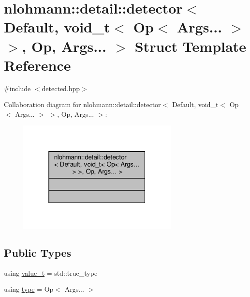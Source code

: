 \hypertarget{structnlohmann_1_1detail_1_1detector_3_01_default_00_01void__t_3_01_op_3_01_args_8_8_8_01_4_01_4_00_01_op_00_01_args_8_8_8_01_4}{}\section{nlohmann\+:\+:detail\+:\+:detector$<$ Default, void\+\_\+t$<$ Op$<$ Args... $>$ $>$, Op, Args... $>$ Struct Template Reference}
\label{structnlohmann_1_1detail_1_1detector_3_01_default_00_01void__t_3_01_op_3_01_args_8_8_8_01_4_01_4_00_01_op_00_01_args_8_8_8_01_4}


{\ttfamily \#include $<$detected.\+hpp$>$}



Collaboration diagram for nlohmann\+:\+:detail\+:\+:detector$<$ Default, void\+\_\+t$<$ Op$<$ Args... $>$ $>$, Op, Args... $>$\+:\nopagebreak
\begin{figure}[H]
\begin{center}
\leavevmode
\includegraphics[width=229pt]{structnlohmann_1_1detail_1_1detector_3_01_default_00_01void__t_3_01_op_3_01_args_8_8_8_01_4_01_480db0229d86331de00894c6a00d19e26}
\end{center}
\end{figure}
\subsection*{Public Types}
\begin{DoxyCompactItemize}
\item 
using \hyperlink{structnlohmann_1_1detail_1_1detector_3_01_default_00_01void__t_3_01_op_3_01_args_8_8_8_01_4_01_4_00_01_op_00_01_args_8_8_8_01_4_ab748f9f00bb31bee4978a033589f8c85}{value\+\_\+t} = std\+::true\+\_\+type
\item 
using \hyperlink{structnlohmann_1_1detail_1_1detector_3_01_default_00_01void__t_3_01_op_3_01_args_8_8_8_01_4_01_4_00_01_op_00_01_args_8_8_8_01_4_a5afd6a40e94dde21d120ac646468c495}{type} = Op$<$ Args... $>$
\end{DoxyCompactItemize}


